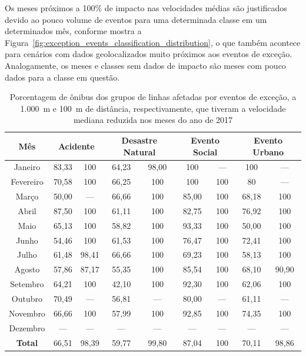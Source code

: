 \documentclass[
	12pt,				%
	oneside,			%
	a4paper,			%
	english,			%
	brazil				%
	]{abntex2ppgsi}
\begin{document}
{{{Os meses próximos a 100\% de impacto nas velocidades médias  são justificados  devido ao pouco volume de eventos para uma determinada classe em um determinados mês, conforme mostra a Figura~\ref{fig:exception_events_classification_distribution},  o que também acontece para cenários com dados geolocalizados muito próximos aos eventos de exceção. Analogamente, os meses e classes sem dados de impacto são meses com pouco dados para a classe em questão.


\begin{table}[!htb]
\centering
\caption {Porcentagem de ônibus dos grupos de linhas afetadas por eventos de exceção, a 1.000~m e 100~m de distância, respectivamente, que tiveram a velocidade mediana reduzida nos meses do ano de 2017}
\label{tab:exceptEventVelocityImpAllStop}
\begin{tabular}{c|cc|cc|cc|cc}
\toprule
\textbf{Mês} & \multicolumn{2}{c}{\textbf{Acidente}} & \multicolumn{2}{c}{\textbf{Desastre Natural}} & \multicolumn{2}{c}{\textbf{Evento Social}} &
\multicolumn{2}{c}{\textbf{Evento Urbano}}\\
\midrule
Janeiro & 83,33 &  100 & 
64,23 &  98,00 & 
100 & --- &
 100 & --- \\
\hline
Fevereiro & 70,58 &  100 &
 66,25 &  100 &
 100 & 100 &
 80 & --- \\
\hline
Março &  50,00 &  --- & 
66,66 &  100 &
85,00 & 100 &
68,18 & 100 \\
\hline
Abril & 87,50 &100 & 
 61,11 & 100 & 
 82,75 & 100 & 
 76,92 &  100 \\
\hline
Maio & 65,13 &  100 &
 58,82 &  100 &
 93,33 & 100 &
 50,00 & 100 \\
\hline
Junho & 54,46 &  100 &
 61,53 &  100 &
 76,47 & 100 &
 72,41 & 100 \\
\hline
Julho & 61,48 &  98,41 &
 66,66 & 100 &
 69,23 & 100 &
58,13 & 100 \\
\hline
Agosto & 57,86 & 87,17 &
 55,35 & 100 &
 85,54 & 100 & 
 68,10 & 90,90 \\
\hline
Setembro & 64,21 & 100 &
 42,10 & 100 &
 92,30 & 100 & 
 62,06 & 100 \\
\hline
Outubro & 70,49 & --- &
 56,81 & --- &
 80,00 & --- &
 61,11 & --- \\
\hline
Novembro & 66,66 & 100 &
 57,99 & 100 &
 92,85 & 100 &
 74,35 & 100 \\
\hline
Dezembro & --- & --- & --- & --- & --- & --- & --- & ---  \\
\midrule
\midrule
\textbf{Total} & 66,51 & 98,39 & 59,77 & 99,80 & 87,04 & 100 & 70,11 & 98,86  \\
\bottomrule
\end{tabular}
\end{table}

}}}
\end{document}
